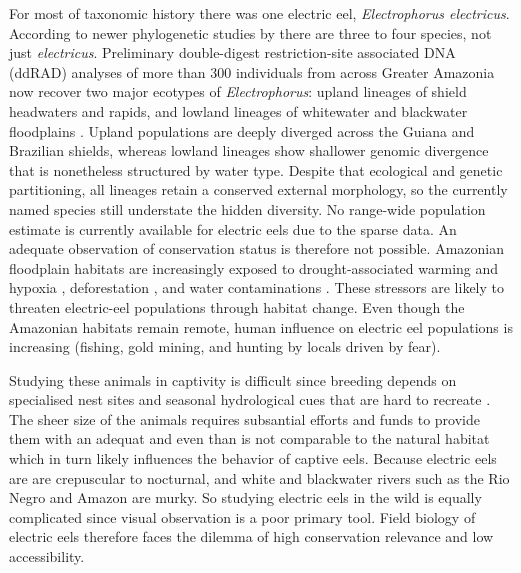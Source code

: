 For most of taxonomic history there was one electric eel, \textit{Electrophorus electricus}. 
According to newer phylogenetic studies by \textcite{santana2019unexpected} there are three to four species, not just \textit{electricus}. 
Preliminary double-digest restriction-site associated DNA (ddRAD) analyses of more than 300 individuals from across Greater Amazonia now recover two major ecotypes of \textit{Electrophorus}: upland lineages of shield headwaters and rapids, and lowland lineages of whitewater and blackwater floodplains \parencite{desantana_rapids_preprint}.
Upland populations are deeply diverged across the Guiana and Brazilian shields, whereas lowland lineages show shallower genomic divergence that is nonetheless structured by water type.
Despite that ecological and genetic partitioning, all lineages retain a conserved external morphology, so the currently named species still understate the hidden diversity.
No range-wide population estimate is currently available for electric eels due to the sparse data. 
An adequate observation of conservation status is therefore not possible. 
Amazonian floodplain habitats are increasingly exposed to drought-associated warming and hypoxia \textcite{ropke2022climate, johannsson2026drought}, deforestation \textcite{ilha2018deforestation}, and water contaminations \textcite{viana2021metals}.
These stressors are likely to threaten electric-eel populations through habitat change.
Even though the Amazonian habitats remain remote, human influence on electric eel populations is increasing (fishing, gold mining, and hunting by locals driven by fear).

Studying these animals in captivity is difficult since breeding depends on specialised nest sites and seasonal hydrological cues that are hard to recreate \parencite{assunccao1995reproduction, bastos2020historia}.
The sheer size of the animals requires subsantial efforts and funds to provide them with an adequat and even than is not comparable to the natural habitat which in turn likely influences the behavior of captive eels.
Because electric eels are are crepuscular to nocturnal, and white and blackwater rivers such as the Rio Negro and Amazon are murky.
So studying electric eels in the wild is equally complicated since visual observation is a poor primary tool. 
Field biology of electric eels therefore faces the dilemma of high conservation relevance and low accessibility.

